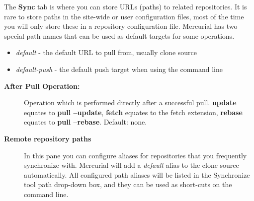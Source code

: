 \documentclass[letterpaper,10pt,english]{manual}
\begin{document}
The \textbf{Sync} tab is where you can store URLs (paths) to related
repositories. It is rare to store paths in the site-wide or user
configuration files, most of the time you will only store these in a
repository configuration file. Mercurial has two special path names that
can be used as default targets for some operations.
\begin{itemize}
\item {} 
\emph{default}     - the default URL to pull from, usually clone source

\item {} 
\emph{default-push} - the default push target when using the command line

\end{itemize}
\begin{description}
\item[\textbf{After Pull Operation:}]
Operation which is performed directly after a successful pull.
\textbf{update} equates to \textbf{pull --update}, \textbf{fetch}
equates to the fetch extension, \textbf{rebase} equates to
\textbf{pull --rebase}.  Default: none.

\item[\textbf{Remote repository paths}]
In this pane you can configure aliases for repositories that you
frequently synchronize with.  Mercurial will add a \emph{default} alias
to the clone source automatically.  All configured path aliases will
be listed in the Synchronize tool path drop-down box, and they can
be used as short-cuts on the command line.

\end{description}
\hypertarget{module-web.settings}{}
\end{document}
